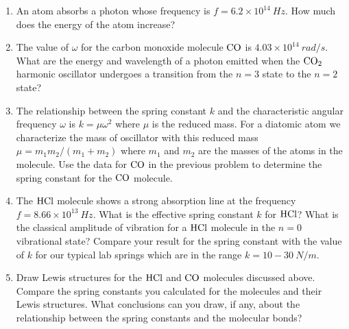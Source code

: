\begin{enumerate}

\item An atom absorbs a photon whose frequency is
$f = 6.2\times 10^{14}~Hz$.
How much does the energy of the atom increase?

\item The value of $\omega$ for the carbon monoxide molecule $\rm CO$ is $4.03\times 10^{14}~rad/s$.
What are the energy and wavelength of a photon emitted when the $\rm CO_2$
harmonic oscillator
undergoes a transition from the $n=3$ state to the $n=2$ state?

\item The relationship between the spring constant $k$ and the characteristic angular frequency $\omega$
is $k = \mu \omega^2$ where $\mu$ is the reduced mass. 
For a diatomic atom we characterize the mass of oscillator with this reduced mass 
$\mu = m_1 m_2/(m_1+m_2)$ where $m_1$ and $m_2$ are the masses of the atoms in the 
molecule.
Use the data for $\rm CO$ in the previous problem to determine the spring constant
for the $\rm CO$ molecule.

\item The $\rm HCl$ molecule shows a strong absorption line at the frequency $f=8.66\times 10^{13} ~Hz$.
What is the effective spring constant $k$ for $\rm HCl$? 
What is the classical amplitude of vibration
for a $\rm HCl$ molecule in the $n=0$ vibrational state?
Compare your result for the spring constant with the value of $k$ for our typical lab springs which
are in the range $k=10-30~N/m$.

\item Draw Lewis structures for the $\rm HCl$ and $\rm CO$ molecules discussed above. Compare the 
spring constants you calculated for the molecules and their Lewis structures.
What conclusions can you draw, if any, about the relationship between the spring constants
and the molecular bonds?


\end{enumerate}
